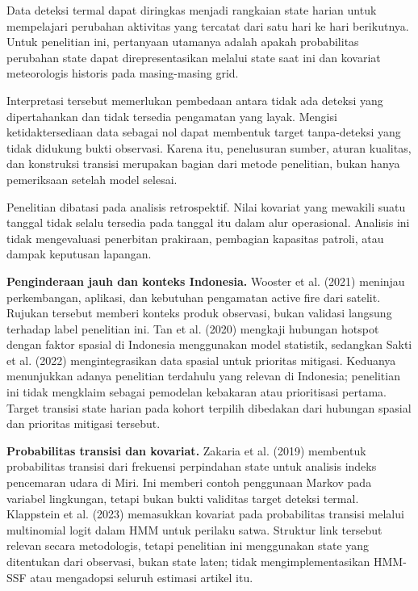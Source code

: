 \documentclass[12pt,a4paper]{article}
\begin{document}
Data deteksi termal dapat diringkas menjadi rangkaian state harian untuk mempelajari perubahan aktivitas yang tercatat dari satu hari ke hari berikutnya. Untuk penelitian ini, pertanyaan utamanya adalah apakah probabilitas perubahan state dapat direpresentasikan melalui state saat ini dan kovariat meteorologis historis pada masing-masing grid.


Interpretasi tersebut memerlukan pembedaan antara tidak ada deteksi yang dipertahankan dan tidak tersedia pengamatan yang layak. Mengisi ketidaktersediaan data sebagai nol dapat membentuk target tanpa-deteksi yang tidak didukung bukti observasi. Karena itu, penelusuran sumber, aturan kualitas, dan konstruksi transisi merupakan bagian dari metode penelitian, bukan hanya pemeriksaan setelah model selesai.


Penelitian dibatasi pada analisis retrospektif. Nilai kovariat yang mewakili suatu tanggal tidak selalu tersedia pada tanggal itu dalam alur operasional. Analisis ini tidak mengevaluasi penerbitan prakiraan, pembagian kapasitas patroli, atau dampak keputusan lapangan.


\textbf{Penginderaan jauh dan konteks Indonesia.} Wooster et al. (2021) meninjau perkembangan, aplikasi, dan kebutuhan pengamatan active fire dari satelit. Rujukan tersebut memberi konteks produk observasi, bukan validasi langsung terhadap label penelitian ini. Tan et al. (2020) mengkaji hubungan hotspot dengan faktor spasial di Indonesia menggunakan model statistik, sedangkan Sakti et al. (2022) mengintegrasikan data spasial untuk prioritas mitigasi. Keduanya menunjukkan adanya penelitian terdahulu yang relevan di Indonesia; penelitian ini tidak mengklaim sebagai pemodelan kebakaran atau prioritisasi pertama. Target transisi state harian pada kohort terpilih dibedakan dari hubungan spasial dan prioritas mitigasi tersebut.


\textbf{Probabilitas transisi dan kovariat.} Zakaria et al. (2019) membentuk probabilitas transisi dari frekuensi perpindahan state untuk analisis indeks pencemaran udara di Miri. Ini memberi contoh penggunaan Markov pada variabel lingkungan, tetapi bukan bukti validitas target deteksi termal. Klappstein et al. (2023) memasukkan kovariat pada probabilitas transisi melalui multinomial logit dalam HMM untuk perilaku satwa. Struktur link tersebut relevan secara metodologis, tetapi penelitian ini menggunakan state yang ditentukan dari observasi, bukan state laten; tidak mengimplementasikan HMM-SSF atau mengadopsi seluruh estimasi artikel itu.
\end{document}
